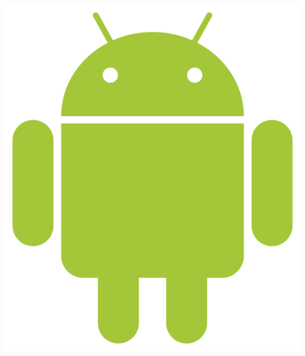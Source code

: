 \documentclass[aspectratio=1610, twocolumn, handout]{beamer}%
\begin{document}
\framegreen
{
  \nologo
  \begin{frameTitle}
  \maketitle
  \end{frameTitle}
}

\begin{frameNoSB} 
\frametitle{\inserttitle}
\begin{columns}
  \begin{column}{.66\linewidth}
    \vspace{0pt}
    \tableofcontents
  \end{column}
  \begin{column}{0.33\linewidth}
  \includegraphics[width=0.75\linewidth]{img/android.png}
  \end{column}
\end{columns}
\end{frameNoSB}

\framepurple


\framebrown


\framebluegray


\frameyellow


\framegray


\frameorange

\end{document}
